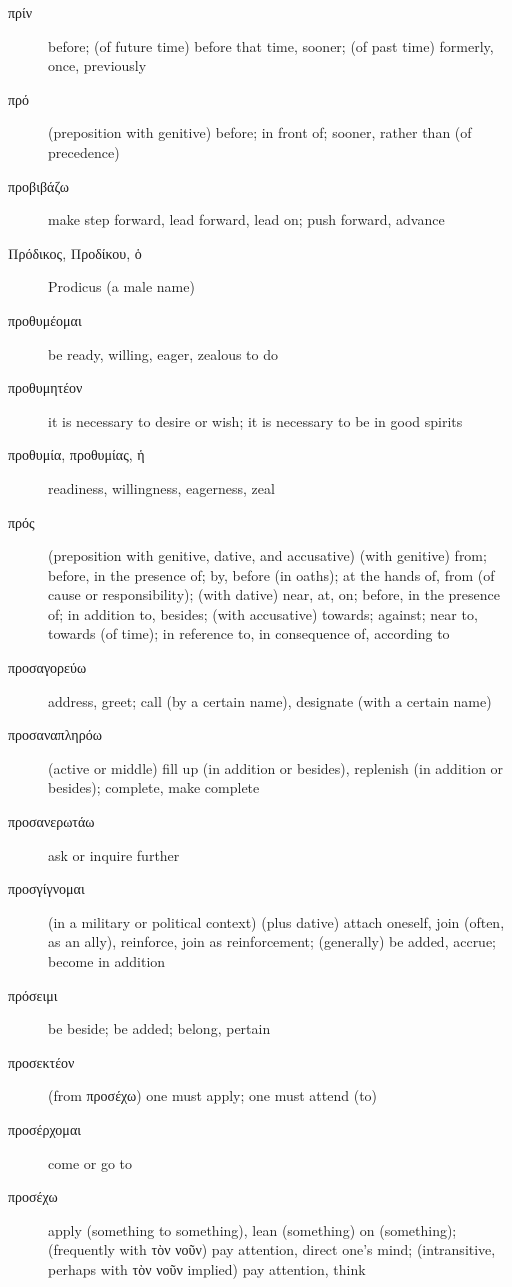 \documentclass[12pt,letterpaper]{article}
\begin{document}
\begin{description}
    \item[\textgreek{πρίν}] \marginnote{*}before; (of future time) before that time, sooner; (of past time) formerly, once, previously
    \item[\textgreek{πρό}] \marginnote{*}(preposition with genitive) before; in front of; sooner, rather than (of precedence)
    \item[\textgreek{προβιβάζω}] make step forward, lead forward, lead on; push forward, advance
    \item[\textgreek{Πρόδικος, Προδίκου, ὁ}] Prodicus (a male name)
    \item[\textgreek{προθυμέομαι}] be ready, willing, eager, zealous to do
    \item[\textgreek{προθυμητέον}] it is necessary to desire or wish; it is necessary to be in good spirits
    \item[\textgreek{προθυμία, προθυμίας, ἡ}] readiness, willingness, eagerness, zeal
    \item[\textgreek{πρός}] \marginnote{*}(preposition with genitive, dative, and accusative) (with genitive) from; before, in the presence of; by, before (in oaths); at the hands of, from (of cause or responsibility); (with dative) near, at, on; before, in the presence of; in addition to, besides; (with accusative) towards; against; near to, towards (of time); in reference to, in consequence of, according to
    \item[\textgreek{προσαγορεύω}] address, greet; call (by a certain name), designate (with a certain name)
    \item[\textgreek{προσαναπληρόω}] (active or middle) fill up (in addition or besides), replenish (in addition or besides); complete, make complete
    \item[\textgreek{προσανερωτάω}] ask or inquire further
    \item[\textgreek{προσγίγνομαι}] (in a military or political context)  (plus dative) attach oneself, join (often, as an ally), reinforce, join as reinforcement; (generally) be added, accrue; become in addition
    \item[\textgreek{πρόσειμι}] be beside; be added; belong, pertain
    \item[\textgreek{προσεκτέον}] (from \textgreek{προσέχω}) one must apply; one must attend (to)
    \item[\textgreek{προσέρχομαι}] come or go to
    \item[\textgreek{προσέχω}] apply (something to something), lean (something) on (something); (frequently with \textgreek{τὸν νοῦν}) pay attention, direct one's mind; (intransitive, perhaps with \textgreek{τὸν νοῦν} implied) pay attention, think

\end{description}
\end{document}
